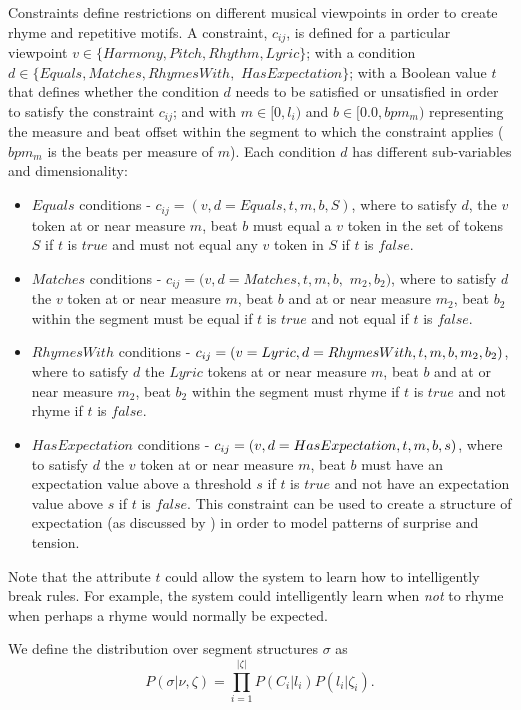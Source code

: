 \documentclass[phd,electronic,oneside,twosidetoc,letterpaper,chaptercenter,parttop,lof,lot]{byumsphd}
\begin{document}
Constraints define restrictions on different musical viewpoints in order to create rhyme and repetitive motifs. A constraint, $c_{ij}$, is defined for a particular viewpoint $v\in\{Harmony, Pitch, Rhythm, Lyric\}$; with a condition $d\in\{Equals, Matches, RhymesWith,$ $HasExpectation\}$; with a Boolean value $t$ that defines whether the condition $d$ needs to be satisfied or unsatisfied in order to satisfy the constraint $c_{ij}$; and with $m\in[0,l_i)$ and $b\in[0.0,bpm_m)$ representing the measure and beat offset within the segment to which the constraint applies ($bpm_m$ is the beats per measure of $m$). Each condition $d$ has different sub-variables and dimensionality:

\begin{itemize}
\item $Equals$ conditions - $c_{ij} = (v,d=Equals,t,m,b,S)$, where to satisfy $d$, the $v$ token at or near measure $m$, beat $b$ must equal a $v$ token in the set of tokens $S$ if $t$ is $true$ and must not equal any $v$ token in $S$ if $t$ is $false$.
\item $Matches$ conditions - $c_{ij} = (v,d=Matches,t,m,b,$ $m_2,b_2)$, where to satisfy $d$ the $v$ token at or near measure $m$, beat $b$ and at or near measure $m_2$, beat $b_2$ within the segment must be equal if $t$ is $true$ and not equal if $t$ is $false$.
\item $RhymesWith$ conditions - $c_{ij} = (v=Lyric,d=Rhy\-mes\-With,t,m,b,m_2,b_2)$, where to satisfy $d$ the $Lyric$ tokens at or near measure $m$, beat $b$ and at or near measure $m_2$, beat $b_2$ within the segment must rhyme if $t$ is $true$ and not rhyme if $t$ is $false$.
\item $HasExpectation$ conditions - $c_{ij} = (v,d=HasEx\-pectation,t,m,b,s)$, where to satisfy $d$ the $v$ token at or near measure $m$, beat $b$ must have an expectation value above a threshold $s$ if $t$ is $true$ and not have an expectation value above $s$ if $t$ is $false$. This constraint can be used to create a structure of expectation (as discussed by \citeauthor{meyer2008emotion} \cite{meyer2008emotion}) in order to model patterns of surprise and tension.
\end{itemize}

Note that the attribute $t$ could allow the system to learn how to intelligently break rules. For example, the system could intelligently learn when \emph{not} to rhyme when perhaps a rhyme would normally be expected.

We define the distribution over segment structures $\sigma$ as
\[ P(\sigma|\nu,\zeta) =  \prod_{i=1}^{|\zeta|} P(C_i | l_i) P(l_i|\zeta_i). \]
\end{document}
